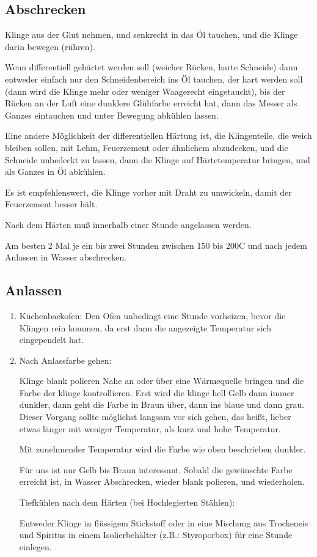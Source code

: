 \documentclass[a4paper]{scrartcl} %
\begin{document}
\subsection{Abschrecken}
Klinge aus der Glut nehmen, und senkrecht in das Öl tauchen, und die Klinge darin bewegen (rühren).

Wenn differentiell gehärtet werden soll (weicher Rücken, harte Schneide) dann entweder einfach nur den Schneidenbereich ins Öl tauchen, der hart werden soll (dann wird die Klinge mehr oder weniger Waagerecht eingetaucht), bis der Rücken an der Luft eine dunklere Glühfarbe erreicht hat, dann das Messer als Ganzes eintauchen und unter Bewegung abkühlen lassen.

Eine andere Möglichkeit der differentiellen Härtung ist, die Klingenteile, die weich bleiben sollen, mit Lehm, Feuerzement oder ähnlichem abzudecken, und die Schneide unbedeckt zu lassen, dann die Klinge auf Härtetemperatur bringen, und als Ganzes in Öl abkühlen.

Es ist empfehlenswert, die Klinge vorher mit Draht zu umwickeln, damit der Feuerzement besser hält.

Nach dem Härten muß innerhalb einer Stunde angelassen werden.

Am besten 2 Mal je ein bis zwei Stunden zwischen 150 bis 200{\degree}C und nach jedem Anlassen in Wasser abschrecken.

\subsection{Anlassen}
\begin{enumerate}
\item Küchenbackofen: Den Ofen unbedingt eine Stunde vorheizen, bevor die Klingen rein kommen, da erst dann die angezeigte Temperatur sich eingependelt hat.

\item Nach Anlassfarbe gehen:

Klinge blank polieren
Nahe an oder über eine Wärmequelle bringen und die Farbe der klinge kontrollieren.
Erst wird die klinge hell Gelb dann immer dunkler, dann geht die Farbe in Braun über, dann ins blaue und dann grau.
Dieser Vorgang sollte möglichst langsam vor sich gehen, das heißt, lieber etwas länger mit weniger Temperatur, als kurz und hohe Temperatur.

Mit zunehmender Temperatur wird die Farbe wie oben beschrieben dunkler.

Für uns ist nur Gelb bis Braun interessant. Sobald die gewünschte Farbe erreicht ist, in Wasser Abschrecken, wieder blank polieren, und wiederholen.

Tiefkühlen nach dem Härten (bei Hochlegierten Stählen):

Entweder Klinge in flüssigem Stickstoff oder in eine Mischung aus Trockeneis und Spiritus in einem Isolierbehälter (z.B.: Styroporbox) für eine Stunde einlegen. 
\end{enumerate}
\end{document}
